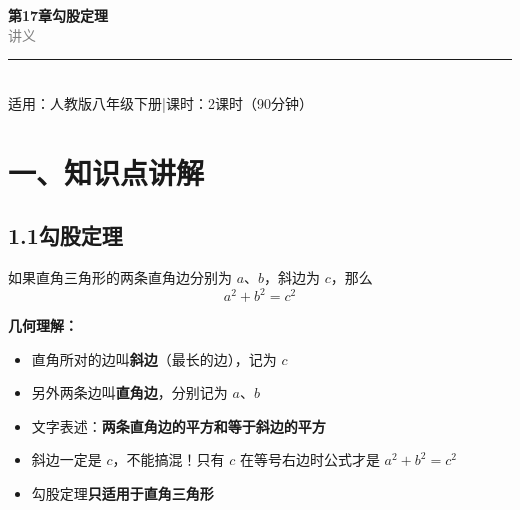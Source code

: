 \documentclass[12pt, a4paper]{ctexart}
\begin{document}
\begin{center}
{\Huge\bfseries\textcolor{mainblue}{第17章\quad 勾股定理}}\\[12pt]
{\Large\textcolor{gray}{讲\quad 义}}\\[8pt]
\rule{0.6\textwidth}{1pt}\\[8pt]
{\normalsize 适用：人教版\quad 八年级下册\quad |\quad 课时：2课时（90分钟）}
\end{center}
\vspace{10pt}

\section*{\textcolor{mainblue}{一、知识点讲解}}

\subsection*{1.1\quad 勾股定理}

\begin{knowledgebox}[定理内容]
如果直角三角形的两条直角边分别为 $a$、$b$，斜边为 $c$，那么
\[
\boxed{a^2 + b^2 = c^2}
\]
\end{knowledgebox}

\vspace{6pt}

\textbf{几何理解：}

\begin{center}
\end{center}

\begin{itemize}[leftmargin=2em]
  \item 直角所对的边叫\textbf{斜边}（最长的边），记为 $c$
  \item 另外两条边叫\textbf{直角边}，分别记为 $a$、$b$
  \item 文字表述：\textbf{两条直角边的平方和等于斜边的平方}
\end{itemize}

\begin{warnbox}[易错提醒]
\begin{itemize}[leftmargin=1.5em, itemsep=2pt]
  \item 斜边一定是 $c$，不能搞混！只有 $c$ 在等号右边时公式才是 $a^2+b^2=c^2$
  \item 勾股定理\textbf{只适用于直角三角形}
\end{itemize}
\end{warnbox}
\end{document}
